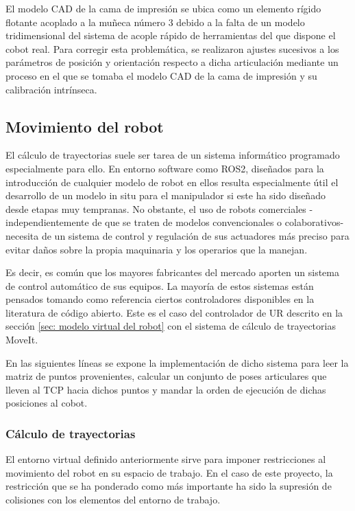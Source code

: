 El modelo \acrshort{CAD} de la cama de impresión se ubica como un elemento rígido flotante acoplado a la muñeca número 3 debido a la falta de un modelo tridimensional del sistema de acople rápido de herramientas del que dispone el cobot real. Para corregir esta problemática, se realizaron ajustes sucesivos a los parámetros de posición y orientación respecto a dicha articulación mediante un proceso en el que se tomaba el modelo \acrshort{CAD} de la cama de impresión y su calibración intrínseca.

\subsection{Movimiento del robot}

El cálculo de trayectorias suele ser tarea de un sistema informático programado especialmente para ello. En entorno software como ROS2, diseñados para la introducción de cualquier modelo de robot en ellos resulta especialmente útil el desarrollo de un modelo in situ para el manipulador si este ha sido diseñado desde etapas muy tempranas. No obstante, el uso de robots comerciales -independientemente de que se traten de modelos convencionales o colaborativos- necesita de un sistema de control y regulación de sus actuadores más preciso para evitar daños sobre la propia maquinaria y los operarios que la manejan.

Es decir, es común que los mayores fabricantes del mercado aporten un sistema de control automático de sus equipos. La mayoría de estos sistemas están pensados tomando como referencia ciertos controladores disponibles en la literatura de código abierto. Este es el caso del controlador de UR descrito en la sección \ref{sec: modelo virtual del robot} con el sistema de cálculo de trayectorias MoveIt. 

En las siguientes líneas se expone la implementación de dicho sistema para leer la matriz de puntos provenientes, calcular un conjunto de poses articulares que lleven al \acrshort{TCP} hacia dichos puntos y mandar la orden de ejecución de dichas posiciones al cobot.

\subsubsection*{Cálculo de trayectorias}
\hypertarget{Cálculo de trayectorias}{}

El entorno virtual definido anteriormente sirve para imponer restricciones al movimiento del robot en su espacio de trabajo. En el caso de este proyecto, la restricción que se ha ponderado como más importante ha sido la supresión de colisiones con los elementos del entorno de trabajo. 

